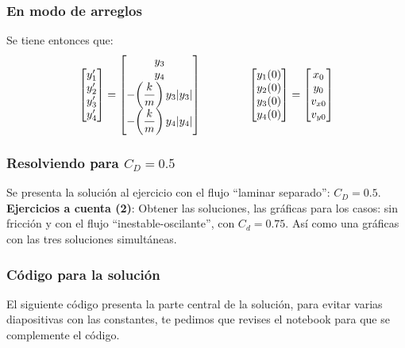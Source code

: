 \documentclass[12pt]{beamer}
\begin{document}
\begin{frame}
\frametitle{En modo de arreglos}
Se tiene entonces que:
\pause
\begin{align*}
\begin{bmatrix}
{y}^{\prime}_{1} \\
{y}^{\prime}_{2} \\
{y}^{\prime}_{3} \\
{y}^{\prime}_{4} 
\end{bmatrix}
= 
\begin{bmatrix}
y_{3} \\
y_{4} \\
- \bigg( \dfrac{k}{m} \bigg) \, y_{3} \abs{y_{3}} \\
- \bigg( \dfrac{k}{m} \bigg) \, y_{4} \abs{y_{4}}
\end{bmatrix}
\hspace{1.5cm}
\begin{bmatrix}
y_{1} (0) \\
y_{2} (0) \\
y_{3} (0) \\
y_{4} (0)
\end{bmatrix}
=
\begin{bmatrix}
x_{0} \\
y_{0} \\
v_{x0} \\
v_{y0}
\end{bmatrix}
\end{align*}
\end{frame}
\begin{frame}
\frametitle{Resolviendo para $C_{D} = 0.5$}
Se presenta la solución al ejercicio con el flujo \enquote{\textcolor{cerise}{laminar separado}}: $C_{D} = 0.5$.
\\
\bigskip
\pause
\textbf{Ejercicios a cuenta (2)}: Obtener las soluciones, las gráficas para los casos: sin fricción y con el flujo \enquote{\textcolor{cobalt}{inestable-oscilante}}, con $C_{d} = 0.75$. Así como una gráficas con las tres soluciones simultáneas.
\end{frame}
\begin{frame}
\frametitle{Código para la solución}
El siguiente código presenta la parte central de la solución, para evitar varias diapositivas con las constantes, te pedimos que revises el notebook para que se complemente el código.
\end{frame}
\end{document}
